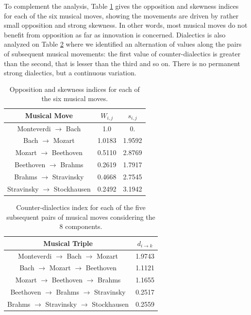 \documentclass[
 aip,
 jmp,
 amsmath,amssymb,
 reprint,
]{revtex4-1}
\begin{document}
To complement the analysis, Table \ref{tab:tableOI} gives the
opposition and skewness indices for each of the six musical moves,
showing the movements are driven by rather small opposition and strong
skewness. In other words, most musical moves do not benefit from
opposition as far as innovation is concerned. Dialectics is also analyzed on Table
\ref{tab:tableE} where we identified an alternation of values along
the pairs of subsequent musical movements: the first value of
counter-dialectics is greater than the second, that is lesser than the
third and so on. There is no permanent strong
dialectics, but a continuous variation.

\begin{table}[ht]
\caption{\label{tab:tableOI}Opposition and skewness indices for each
of the six musical moves.}

\begin{tabular}{|c||c|c|}
\hline
Musical Move & $W_{i,j}$ & $s_{i,j}$ \\
\hline \hline

 Monteverdi $\to$ Bach             &   1.0     &  0.      \\
 Bach $\to$ Mozart                 &   1.0183  &  1.9592  \\
 Mozart $\to$ Beethoven            &   0.5110  &  2.8769  \\
 Beethoven $\to$ Brahms            &   0.2619  &  1.7917  \\
 Brahms $\to$ Stravinsky           &   0.4668  &  2.7545  \\
 Stravinsky $\to$ Stockhausen      &   0.2492  &  3.1942  \\

\hline
\end{tabular}
\end{table}

\begin{table}[ht]
\caption{\label{tab:tableE} Counter-dialectics index for each
of the five subsequent pairs of musical moves considering the 8 components.}

\begin{tabular}{|c||c|}
\hline
Musical Triple & $d_{i \rightarrow k}$ \\
\hline \hline

 Monteverdi $\to$ Bach $\to$ Mozart          & 1.9743 \\
 Bach $\to$ Mozart $\to$ Beethoven           & 1.1121 \\
 Mozart $\to$ Beethoven $\to$ Brahms         & 1.1655 \\
 Beethoven $\to$ Brahms $\to$ Stravinsky     & 0.2517 \\
 Brahms $\to$ Stravinsky $\to$ Stockhausen   & 0.2559 \\

\hline
\end{tabular}
\end{table}
\end{document}
